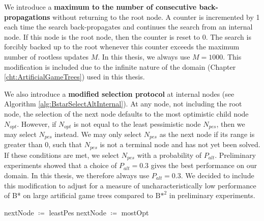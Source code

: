 We introduce a \textbf{maximum to the number of consecutive back-propagations} without returning to the root node. A counter is incremented by 1 each time the search back-propagates and continues the search from an internal node. If this node is the root node, then the counter is reset to 0. The search is forcibly backed up to the root whenever this counter exceeds the maximum number of rootless updates $M$. In this thesis, we always use $M=1000$. This modification is included due to the infinite nature of the domain (Chapter \ref{cht:ArtificialGameTrees}) used in this thesis.

We also introduce a \textbf{modified selection protocol} at internal nodes (see Algorithm \ref{alg:BstarSelectAltInternal}). At any node, not including the root node, the selection of the next node defaults to the most optimistic child node $N_{opt}$. However, if $N_{opt}$ is not equal to the least pessimistic node $N_{pes}$, then we may select $N_{pes}$ instead.
We may only select $N_{pes}$ as the next node if its range is greater than 0, such that $N_{pes}$ is not a terminal node and has not yet been solved.
If these conditions are met, we select $N_{pes}$ with a probability of $P_{alt}$.
Preliminary experiments showed that a choice of $P_{alt}=0.3$ gives the best performance on our domain. In this thesis, we therefore always use $P_{alt}=0.3$. We decided to include this modification to adjust for a measure of uncharacteristically low performance of B* on large artificial game trees compared to ${\text{B*}}^2$ in preliminary experiments.

\begin{algorithm}[h!b]
\begin{algorithmic}[1]
\State nextNode $\coloneqq$ leastPes
\Else
\State nextNode $\coloneqq$ mostOpt
\EndIf
\end{algorithmic}
\caption{selectAlternative$\left(\text{leastPes, mostOpt}, P_{alt}\right) \to$ nextNode}
\label{alg:BstarSelectAltInternal}
\end{algorithm}

